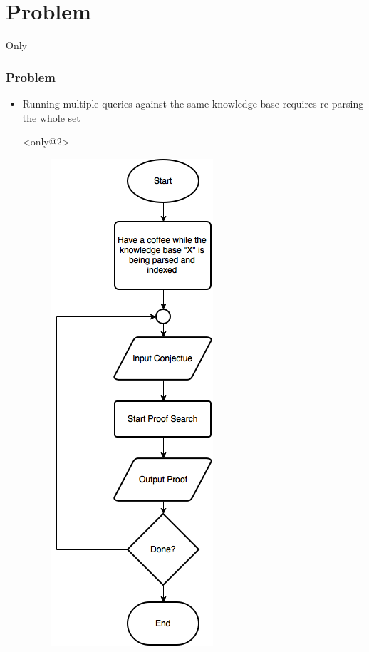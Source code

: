\documentclass[10pt]{beamer}
\begin{document}
\section{Problem}
\begin{frame}[fragile]{Only}
  \frametitle{Problem}
  \begin{itemize}
    \item<only@1,3>Running multiple queries against the same knowledge base requires re-parsing the whole set

    \item[]<only@2> \begin{figure}
        \includegraphics[width=\linewidth,height=\textheight,keepaspectratio]{imgs/NewDeductionFC.png}

\end{figure}
\end{itemize}
\end{frame}
\end{document}
